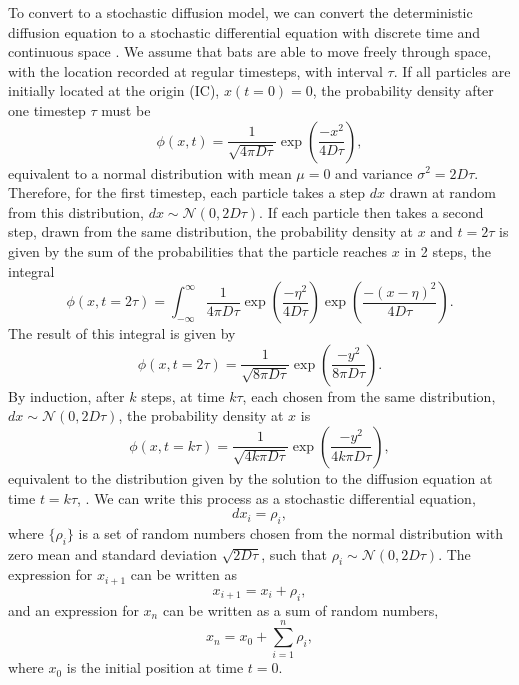 To convert to a stochastic diffusion model, we can convert the deterministic
diffusion equation to a stochastic differential equation with discrete time and
continuous space \cite{ghoniem1985grid,roberts2002langevin}. We assume that bats
are able to move freely through space, with the location recorded at regular
timesteps, with interval $\tau$. If all particles are initially located at the
origin (IC), $x(t=0)=0$, the probability density after one timestep $\tau$ must
be
%
\begin{equation}
\phi(x,t) = \frac{1}{\sqrt{4\pi D\tau}}\exp \left(\frac{-x^2}{4D\tau} \right) ,
\end{equation}
%
equivalent to a normal distribution with mean $\mu = 0$ and variance $\sigma^2 =
2D\tau$. Therefore, for the first timestep, each particle takes a step $dx$
drawn at random from this distribution, $dx \sim \mathcal{N}(0,2D\tau)$. If each
particle then takes a second step, drawn from the same distribution, the
probability density at $x$ and $t = 2\tau$ is given by the sum of the
probabilities that the particle reaches $x$ in 2 steps, the integral
%
\begin{equation}
\phi(x,t=2\tau) = \int_{-\infty}^{\infty} \frac{1}{4\pi D \tau} \exp \left(\frac{-\eta^2}{4D\tau} \right) \exp \left(\frac{-(x-\eta)^2}{4D\tau}\right).
\end{equation}
The result of this integral is given by
%
\begin{equation}
\phi(x,t=2\tau) = \frac{1}{\sqrt{8\pi D\tau}} \exp \left(\frac{-y^2}{8\pi D\tau} \right).
\end{equation}
%
By induction, after $k$ steps, at time $k\tau$, each chosen from the same distribution, $dx \sim \mathcal{N}(0,2D\tau)$, the probability density at $x$ is
%
\begin{equation}
\phi(x,t=k\tau) = \frac{1}{\sqrt{4k\pi D\tau}} \exp \left(\frac{-y^2}{4k\pi D\tau} \right),
\end{equation}
%
equivalent to the distribution given by the solution to the diffusion equation at time $t=k\tau$, .
%
We can write this process as a stochastic differential equation,
%
\begin{equation}
dx_i = \rho_i,
\label{eqn:SDE}
\end{equation}
%
where $\{\rho_i\}$ is a set of random numbers chosen from the normal distribution with zero mean and standard deviation $\sqrt{2D\tau}$, such that $\rho_i \sim \mathcal{N}(0,2D\tau)$. The expression for $x_{i+1}$ can be written as
%
\begin{equation}
x_{i+1} = x_i + \rho_i,
\end{equation}
%
and an expression for $x_n$ can be written as a sum of random numbers,
\begin{equation}
x_{n} = x_0 + \sum_{i=1}^{n} \rho_i,
\end{equation}
%
where $x_0$ is the initial position at time $t=0$.


